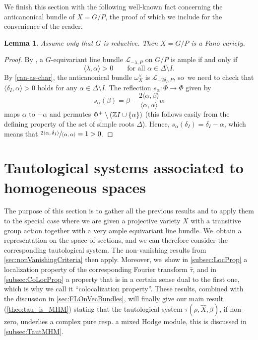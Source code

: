 \documentclass[11pt]{article}
\newcommand{\resp}{resp.\xspace}
\newtheorem{lem}[thm]{Lemma}
\newcommand{\Ell}{\mathscr{L}}
\begin{document}
We finish this section with the following well-known fact concerning the anticanonical bundle of $X=G/P$, the proof of which we include for the convenience of the reader.

\begin{lem}\label{lem:Fano}
Assume only that $G$ is reductive. Then $X=G/P$ is a Fano variety.
\end{lem}

\begin{proof}
By \cite[II.4.4]{Jantzen}, a $G$-equivariant line bundle $\Ell_{-\lambda,P}$ on $G/P$ is ample if and only if
\[
\langle \lambda, \alpha \rangle > 0 \qquad \text{for all $\alpha \in \Delta \setminus I$}.
\]
By \cref{can-as-char}, the anticanonical bundle $\omega_X^{\vee}$ is $\Ell_{-2\delta_I,P}$, so~we need to check that $\langle \delta_I, \alpha \rangle > 0$ holds for any $\alpha \in \Delta \setminus I$. The reflection $s_\alpha \colon \Phi \to \Phi$ given by
\[
s_\alpha(\beta) = \beta-\frac{2\langle \alpha, \beta \rangle}{\langle \alpha, \alpha \rangle} \alpha
\]
maps $\alpha$ to $-\alpha$ and permutes $\Phi^+ \setminus ({\mathbb Z} I \cup \{\alpha\})$ (this follows easily from the defining property of the set of simple roots $\Delta$). Hence, $s_\alpha(\delta_I) = \delta_I - \alpha$, which means that $\sfrac{2\langle \alpha, \delta_I\rangle}{\langle \alpha, \alpha \rangle} = 1 > 0$.
\end{proof}

\section{Tautological systems associated to homogeneous spaces} \label{sec:tautologicalSystems}

The purpose of this section is to gather all the previous results and to apply them to the special case where we are given a projective variety $X$ with a transitive group action together with a very ample equivariant line bundle. We~obtain a representation on the space of sections, and we can therefore consider the corresponding tautological system. The non-vanishing results from \cref{sec:nonVanishingCriteria} then apply. Moreover, we~show in \cref{subsec:LocProp} a localization property of the corresponding Fourier transform $\hat{\tau}$, and in \cref{subsec:CoLocProp} a property that is in a certain sense dual to the first one, which is why we call it ``colocalization property''. These results, combined with the discussion in \cref{sec:FLOnVecBundles}, will finally give our main result
(\cref{theo:tau_is_MHM}) stating that the tautological system $\tau(\rho,\hat{X},\beta)$, if non-zero, underlies a complex pure \resp a mixed Hodge module, this is discussed in \cref{subsec:TautMHM}.
\end{document}
